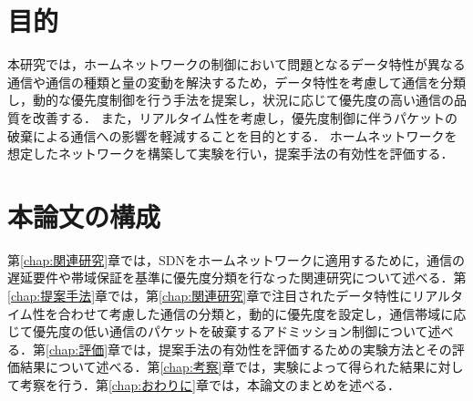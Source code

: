 \documentclass[a4paper,11pt,uplatex]{ujreport}
\begin{document}

\section{目的}
\label{sec:目的}

    本研究では，ホームネットワークの制御において問題となるデータ特性が異なる通信や通信の種類と量の変動を解決するため，データ特性を考慮して通信を分類し，動的な優先度制御を行う手法を提案し，状況に応じて優先度の高い通信の品質を改善する．
    また，リアルタイム性を考慮し，優先度制御に伴うパケットの破棄による通信への影響を軽減することを目的とする．
    ホームネットワークを想定したネットワークを構築して実験を行い，提案手法の有効性を評価する．





\section{本論文の構成}
\label{sec:本論文の構成}

  第\ref{chap:関連研究}章では，SDNをホームネットワークに適用するために，通信の遅延要件や帯域保証を基準に優先度分類を行なった関連研究について述べる．第\ref{chap:提案手法}章では，第\ref{chap:関連研究}章で注目されたデータ特性にリアルタイム性を合わせて考慮した通信の分類と，動的に優先度を設定し，通信帯域に応じて優先度の低い通信のパケットを破棄するアドミッション制御について述べる．第\ref{chap:評価}章では，提案手法の有効性を評価するための実験方法とその評価結果について述べる．第\ref{chap:考察}章では，実験によって得られた結果に対して考察を行う．第\ref{chap:おわりに}章では，本論文のまとめを述べる．
\end{document}
